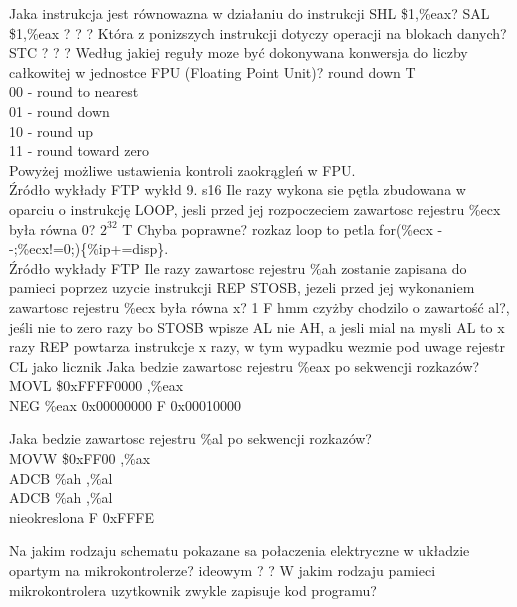 {Jaka instrukcja jest równowazna w działaniu do instrukcji SHL \$1,\%eax?}
{SAL \$1,\%eax}
{?}
{?}
{?}
\answer
{Która z ponizszych instrukcji dotyczy operacji na blokach danych?}
{STC}
{?}
{?}
{?}
\answer
{Według jakiej reguły moze być dokonywana konwersja do liczby całkowitej w jednostce FPU (Floating Point Unit)?
}
{round down}
{T}
{\\
	00 - round to nearest\\
	01 - round down\\
	10 - round up\\
	11 - round toward zero\\}
{Powyżej możliwe ustawienia kontroli zaokrągleń w FPU. \\Źródło wykłady FTP wykłd 9. s16}
\answer
{Ile razy wykona sie pętla zbudowana w oparciu o instrukcję LOOP, jesli przed jej rozpoczeciem zawartosc rejestru \%ecx była równa 0? }
{$2^{32}$}
{T}
{Chyba poprawne?}
{rozkaz loop to petla for(\%ecx - -;\%ecx!=0;)\{\%ip+=disp\}. \\Źródło wykłady FTP}
\answer
{Ile razy zawartosc rejestru \%ah zostanie zapisana do pamieci poprzez uzycie instrukcji REP STOSB, jezeli przed jej wykonaniem zawartosc rejestru \%ecx była równa x?}
{1}
{F}
{hmm czyżby chodzilo o zawartość al?, jeśli nie to zero razy bo STOSB wpisze AL nie AH, a jesli mial na mysli AL to x razy}
{REP powtarza instrukcje x razy, w tym wypadku wezmie pod uwage rejestr CL jako licznik}
\answer
{
	Jaka bedzie zawartosc rejestru \%eax po sekwencji rozkazów?\\
	MOVL \$0xFFFF0000 ,\%eax\\
	NEG \%eax
}
{0x00000000}
{F}
{0x00010000}
{
	
}
\answer
{Jaka bedzie zawartosc rejestru \%al po sekwencji rozkazów? \\
	MOVW \$0xFF00 ,\%ax\\
	ADCB \%ah ,\%al\\
	ADCB \%ah ,\%al\\
	}
{nieokreslona}
{F}
{0xFFFE}
{
	
}
\answer
{Na jakim rodzaju schematu pokazane sa połaczenia elektryczne w układzie opartym na mikrokontrolerze?}
{ideowym}
{?}
{?}
{}
\answer
{W jakim rodzaju pamieci mikrokontrolera uzytkownik zwykle zapisuje kod programu?}
